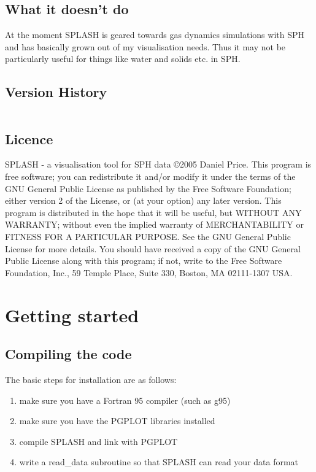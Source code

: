\documentclass[a4paper,11pt]{article}
\begin{document}
\subsection{What it doesn't do}
At the moment SPLASH is geared towards gas dynamics
simulations with SPH and has basically grown out of my visualisation needs.
Thus it may not be particularly useful for things like water and solids etc. in SPH.

\subsection{Version History}

\begin{tabular}{|l|l|p{}|}
\hline

\hline
\end{tabular}

\subsection{Licence}
SPLASH - a visualisation tool for SPH data \copyright 2005 Daniel Price.
 This program is free software; you can redistribute it and/or modify it under the terms of the GNU General Public License as published by the Free Software Foundation; either version 2 of the License, or (at your option) any later version. This program is distributed in the hope that it will be useful, but WITHOUT ANY WARRANTY; without even the implied warranty of MERCHANTABILITY or FITNESS FOR A PARTICULAR PURPOSE.  See the GNU General Public License for more details. You should have received a copy of the GNU General Public License along with this program; if not, write to the Free Software Foundation, Inc., 59 Temple Place, Suite 330, Boston, MA  02111-1307  USA.

\section{Getting started}
\subsection{Compiling the code}
The basic steps for installation are as follows:
\begin{enumerate}
\item make sure you have a Fortran 95 compiler (such as g95)
\item make sure you have the PGPLOT libraries installed
\item compile SPLASH and link with PGPLOT
\item write a read\_data subroutine so that SPLASH can read your data format
\end{enumerate}
\end{document}
